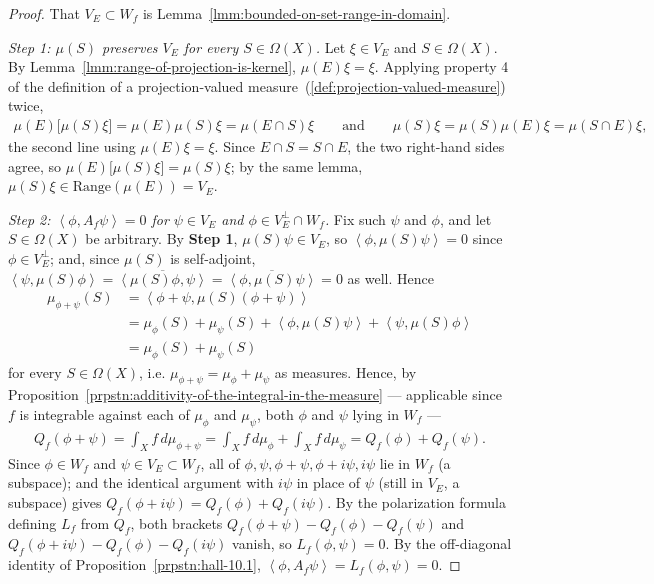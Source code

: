 \begin{proof}
    \leanok
That $V_E \subset W_f$ is Lemma~\ref{lmm:bounded-on-set-range-in-domain}.

\textit{Step 1: $\mu(S)$ preserves $V_E$ for every $S \in \Omega(X)$.} Let $\xi \in V_E$ and $S \in \Omega(X)$. By Lemma~\ref{lmm:range-of-projection-is-kernel}, $\mu(E)\xi = \xi$. Applying property 4 of the definition of a projection-valued measure~(\ref{def:projection-valued-measure}) twice,
\begin{align}
    \mu(E)\big[ \mu(S)\xi \big] = \mu(E)\mu(S)\xi = \mu(E \cap S)\xi
    \qquad\text{and}\qquad
    \mu(S)\xi = \mu(S)\mu(E)\xi = \mu(S \cap E)\xi,
\end{align}
the second line using $\mu(E)\xi = \xi$. Since $E \cap S = S \cap E$, the two right-hand sides agree, so $\mu(E)\big[\mu(S)\xi\big] = \mu(S)\xi$; by the same lemma, $\mu(S)\xi \in \text{Range}(\mu(E)) = V_E$.

\textit{Step 2: $\left< \phi, A_f\psi \right> = 0$ for $\psi \in V_E$ and $\phi \in V_E^\perp \cap W_f$.} Fix such $\psi$ and $\phi$, and let $S \in \Omega(X)$ be arbitrary. By \textbf{Step 1}, $\mu(S)\psi \in V_E$, so $\left< \phi, \mu(S)\psi \right> = 0$ since $\phi \in V_E^\perp$; and, since $\mu(S)$ is self-adjoint, $\left< \psi, \mu(S)\phi \right> = \overline{\left< \mu(S)\phi, \psi \right>} = \overline{\left< \phi, \mu(S)\psi \right>} = 0$ as well. Hence
\begin{align}
    \mu_{\phi+\psi}(S) &= \left< \phi + \psi, \mu(S)(\phi+\psi) \right> \\
                &= \mu_\phi(S) + \mu_\psi(S) + \left< \phi, \mu(S)\psi \right> + \left< \psi, \mu(S)\phi \right> \\
                &= \mu_\phi(S) + \mu_\psi(S)
\end{align}
for every $S \in \Omega(X)$, i.e. $\mu_{\phi+\psi} = \mu_\phi + \mu_\psi$ as measures. Hence, by Proposition~\ref{prpstn:additivity-of-the-integral-in-the-measure} — applicable since $f$ is integrable against each of $\mu_\phi$ and $\mu_\psi$, both $\phi$ and $\psi$ lying in $W_f$ —
\begin{align}
    Q_f(\phi+\psi) = \int_X f \, d\mu_{\phi+\psi} = \int_X f \, d\mu_\phi + \int_X f \, d\mu_\psi = Q_f(\phi) + Q_f(\psi).
\end{align}
 Since $\phi \in W_f$ and $\psi \in V_E \subset W_f$, all of $\phi, \psi, \phi+\psi, \phi+i\psi, i\psi$ lie in $W_f$ (a subspace); and the identical argument with $i\psi$ in place of $\psi$ (still in $V_E$, a subspace) gives $Q_f(\phi+i\psi) = Q_f(\phi) + Q_f(i\psi)$. By the polarization formula defining $L_f$ from $Q_f$, both brackets $Q_f(\phi+\psi) - Q_f(\phi) - Q_f(\psi)$ and $Q_f(\phi+i\psi) - Q_f(\phi) - Q_f(i\psi)$ vanish, so $L_f(\phi,\psi) = 0$. By the off-diagonal identity of Proposition~\ref{prpstn:hall-10.1}, $\left< \phi, A_f\psi \right> = L_f(\phi,\psi) = 0$.


\end{proof}
